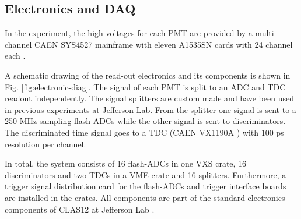 \documentclass[3p,final,twocolumn]{elsarticle}
\begin{document}
\subsection{Electronics and DAQ}
In the experiment, the high voltages for each PMT are provided by a multi-channel CAEN SYS4527 mainframe with eleven A1535SN cards with 24 channel each \cite{caen-hvframe,caen-hvcard}.

A schematic drawing of the read-out electronics and its components is shown in Fig. \ref{fig:electronic-diag}. The signal of each PMT is split to an ADC and TDC readout independently. 
The signal splitters are custom made and have been used in previous experiments at Jefferson Lab.
From the splitter one signal is sent to a 250 \si{\mega\hertz} sampling flash-ADCs \cite{fadc-manual} while the other signal is sent to  discriminators.
The discriminated time signal goes to a TDC (CAEN VX1190A \cite{caen-tdc}) with 100 ps resolution per channel. 

In total, the system consists of 16 flash-ADCs in one VXS crate, 16 discriminators and two TDCs in a VME crate and 16 splitters.  Furthermore, a trigger signal distribution card for the flash-ADCs and trigger interface boards are installed in the crates. All components are part of the standard electronics components of CLAS12 at Jefferson Lab \cite{clas12-daq, clas12-trigger}.
\end{document}
